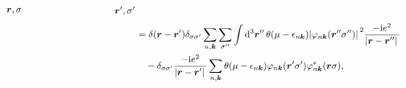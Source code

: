 \[\begin{aligned}
\begin{gathered}
\begin{tikzpicture}[x=0.75pt,y=0.75pt,yscale=-1,xscale=1]
                \draw (272,240) node [anchor=east] [inner sep=0.75pt]    {$\boldsymbol{r} , \sigma $};
                \draw (400.44,239.78) node [anchor=west] [inner sep=0.75pt]    {$\boldsymbol{r} ', \sigma'$};
                \end{tikzpicture}            
        \end{gathered} \\
        &= \delta(\vb*{r} - \vb*{r}') \delta_{\sigma \sigma'} \sum_{n, \vb*{k}} \sum_{\sigma''} \int \dd[3]{\vb*{r}''} \theta(\mu - \epsilon_{n \vb*{k}}) \abs*{\varphi_{n \vb*{k}}(\vb*{r}'' \sigma'')}^2 \frac{- \ii e^2}{\abs*{\vb*{r} - \vb*{r}''}} \\
        &\quad - \delta_{\sigma \sigma'} \frac{- \ii e^2}{\abs*{\vb*{r} - \vb*{r}'}} \sum_{n, \vb*{k}} \theta(\mu - \epsilon_{n \vb*{k}}) \varphi_{n \vb*{k}}(\vb*{r}' \sigma') \varphi_{n \vb*{k}}^*(\vb*{r} \sigma),
    \end{aligned} 
\]